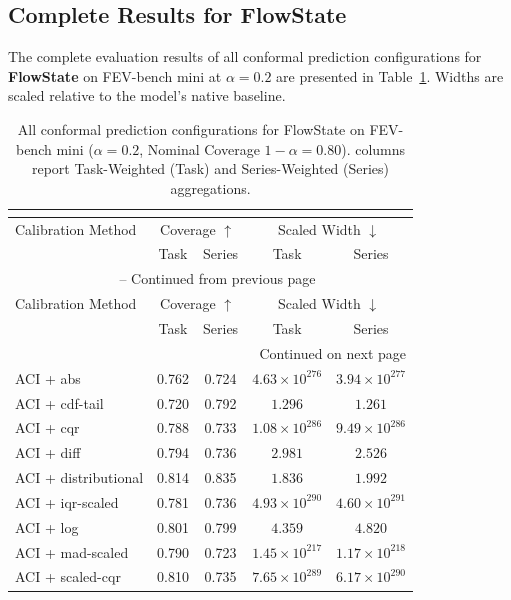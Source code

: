 \subsection{Complete Results for FlowState}
The complete evaluation results of all conformal prediction configurations for \textbf{FlowState} on FEV-bench mini at $\alpha=0.2$ are presented in Table~\ref{tab:all_results_flowstate}. Widths are scaled relative to the model's native baseline.

\begin{longtable}{lcccc}
	\caption{All conformal prediction configurations for FlowState on FEV-bench mini ($\alpha=0.2$, Nominal Coverage $1-\alpha=0.80$). columns report Task-Weighted (Task) and Series-Weighted (Series) aggregations.}\\
	\label{tab:all_results_flowstate}\\
	\hline
	Calibration Method & \multicolumn{2}{c}{Coverage $\uparrow$} & \multicolumn{2}{c}{Scaled Width $\downarrow$} \\
 & Task & Series & Task & Series \\
	\hline
	\endfirsthead
	\multicolumn{5}{c}{\tablename\ \thetable\ -- Continued from previous page} \\
	\hline
	Calibration Method & \multicolumn{2}{c}{Coverage $\uparrow$} & \multicolumn{2}{c}{Scaled Width $\downarrow$} \\
 & Task & Series & Task & Series \\
	\hline
	\endhead
	\hline \multicolumn{5}{r}{{Continued on next page}} \\
	\endfoot
	\hline
	\endlastfoot
	ACI + abs & 0.762 & 0.724 & $4.63 \times 10^{276}$ & $3.94 \times 10^{277}$ \\
	ACI + cdf-tail & 0.720 & 0.792 & $1.296$ & $1.261$ \\
	ACI + cqr & 0.788 & 0.733 & $1.08 \times 10^{286}$ & $9.49 \times 10^{286}$ \\
	ACI + diff & 0.794 & 0.736 & $2.981$ & $2.526$ \\
	ACI + distributional & 0.814 & 0.835 & $1.836$ & $1.992$ \\
	ACI + iqr-scaled & 0.781 & 0.736 & $4.93 \times 10^{290}$ & $4.60 \times 10^{291}$ \\
	ACI + log & 0.801 & 0.799 & $4.359$ & $4.820$ \\
	ACI + mad-scaled & 0.790 & 0.723 & $1.45 \times 10^{217}$ & $1.17 \times 10^{218}$ \\
	ACI + scaled-cqr & 0.810 & 0.735 & $7.65 \times 10^{289}$ & $6.17 \times 10^{290}$ \\

\end{longtable}
